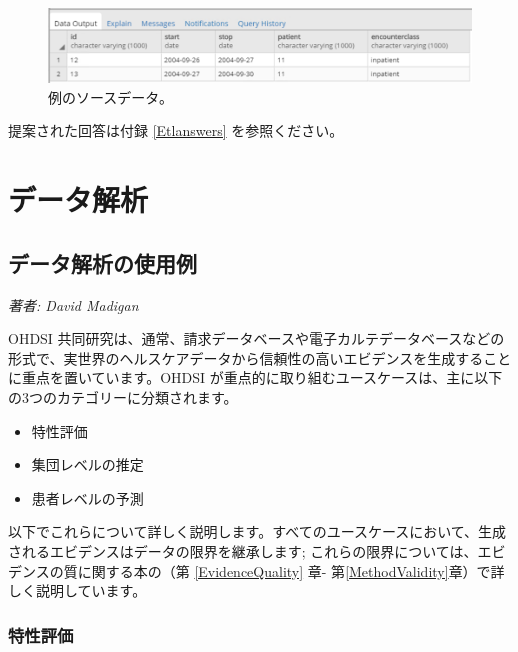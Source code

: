 \documentclass[
  11pt]{book}
\providecommand{\tightlist}{%
  \setlength{\itemsep}{0pt}\setlength{\parskip}{0pt}}
\theoremstyle{definition}
\theoremstyle{definition}
\theoremstyle{definition}
\theoremstyle{definition}
\theoremstyle{remark}
\begin{document}
\begin{figure}

{\centering \includegraphics[width=1\linewidth]{images/ExtractTransformLoad/exerciseSourceData} 

}

\caption{例のソースデータ。}\label{fig:exerciseSourceData}
\end{figure}

提案された回答は付録 \ref{Etlanswers} を参照ください。

\part{データ解析}\label{part-ux30c7ux30fcux30bfux89e3ux6790}

\chapter{データ解析の使用例}\label{DataAnalyticsUseCases}

\emph{著者: David Madigan}

OHDSI 共同研究は、通常、請求データベースや電子カルテデータベースなどの形式で、実世界のヘルスケアデータから信頼性の高いエビデンスを生成することに重点を置いています。OHDSI が重点的に取り組むユースケースは、主に以下の3つのカテゴリーに分類されます。

\begin{itemize}
\tightlist
\item
  特性評価
\item
  集団レベルの推定
\item
  患者レベルの予測
\end{itemize}

以下でこれらについて詳しく説明します。すべてのユースケースにおいて、生成されるエビデンスはデータの限界を継承します; これらの限界については、エビデンスの質に関する本の（第 \ref{EvidenceQuality} 章- 第\ref{MethodValidity}章）で詳しく説明しています。

\section{特性評価}\label{ux7279ux6027ux8a55ux4fa1}

\end{document}
